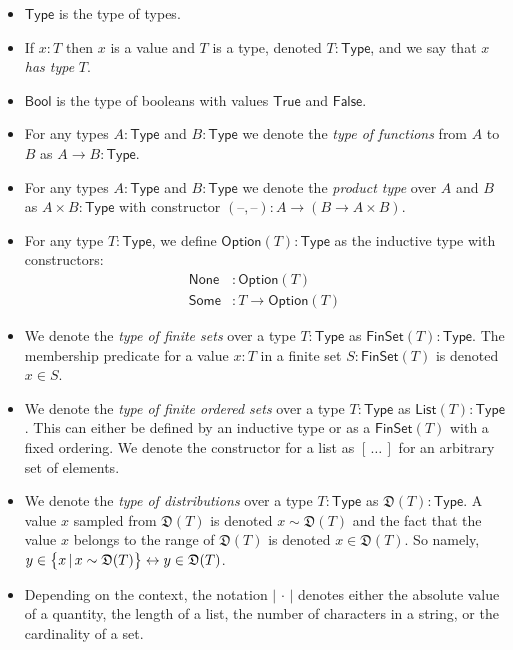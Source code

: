 \documentclass[a4paper]{article}
\theoremstyle{definition}
\newcommand{\dash}{{\textrm{--}}}
\renewcommand{\abs}[1]{\left|#1\right|}
\newcommand{\Bool}{{\textsf{Bool}}}
\newcommand{\False}{{\textsf{False}}}
\newcommand{\FinSet}{{\textsf{FinSet}}}
\newcommand{\List}{{\textsf{List}}}
\newcommand{\None}{{\textsf{None}}}
\newcommand{\Option}{{\textsf{Option}}}
\newcommand{\Some}{{\textsf{Some}}}
\newcommand{\True}{{\textsf{True}}}
\newcommand{\Type}{{\textsf{Type}}}
\begin{document}
\begin{itemize}
    \item $\Type$ is the type of types\footnotemark{}.
    \item If $x : T$ then $x$ is a value and $T$ is a type, denoted $T : \Type$, and we say that $x$ \emph{has type} $T$.
    \item $\Bool$ is the type of booleans with values $\True$ and $\False$.
    \item For any types $A : \Type$ and $B : \Type$ we denote the \emph{type of functions} from $A$ to $B$ as $A \to B : \Type$.
    \item For any types $A : \Type$ and $B : \Type$ we denote the \emph{product type} over $A$ and $B$ as $A \times B : \Type$ with constructor $(\dash, \dash) : A \to (B \to A \times B)$.
    \item For any type $T : \Type$, we define $\Option(T) : \Type$ as the inductive type with constructors:
        \begin{align*}
            \None &: \Option(T) \\
            \Some &: T \to \Option(T)
        \end{align*}
    \item We denote the \emph{type of finite sets} over a type $T : \Type$ as $\FinSet(T) : \Type$. The membership predicate for a value $x : T$ in a finite set $S : \FinSet(T)$ is denoted $x \in S$.
    \item We denote the \emph{type of finite ordered sets} over a type $T : \Type$ as $\List(T) : \Type$. This can either be defined by an inductive type or as a $\FinSet(T)$ with a fixed ordering. We denote the constructor for a list as $[\,\dots\,]$ for an arbitrary set of elements.
    \item We denote the \emph{type of distributions} over a type $T : \Type$ as $\mathfrak{D}(T) : \Type$. A value $x$ sampled from $\mathfrak{D}(T)$ is denoted $x \sim \mathfrak{D}(T)$ and the fact that the value $x$ belongs to the range of $\mathfrak{D}(T)$ is denoted $x \in \mathfrak{D}(T)$. So namely, $y \in \set{x \,|\, x \sim \mathfrak{D}(T)} \leftrightarrow y \in \mathfrak{D}(T)$.
    \item Depending on the context, the notation $\abs{\,\cdot\,}$ denotes either the absolute value of a quantity, the length of a list, the number of characters in a string, or the cardinality of a set.
\end{itemize}

\end{document}
